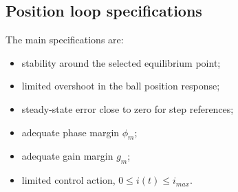 \subsection{Position loop specifications}

The main specifications are:
\begin{itemize}[leftmargin=1.2cm]
    \item stability around the selected equilibrium point;
    \item limited overshoot in the ball position response;
    \item steady-state error close to zero for step references;
    \item adequate phase margin $\phi_m$;
    \item adequate gain margin $g_m$;
    \item limited control action, $0 \leq i(t) \leq i_{max}$.
\end{itemize}
